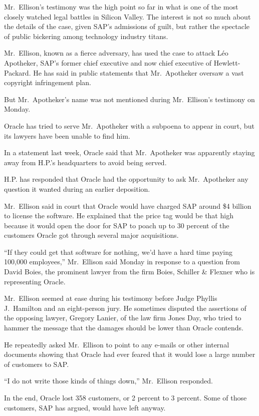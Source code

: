 ﻿\documentclass[12pt]{article}
\begin{document}
Mr.~Ellison's testimony was the high point so far in what is one of the most closely watched legal
battles in Silicon Valley. The interest is not so much about the details of the case, given SAP's
admissions of guilt, but rather the spectacle of public bickering among technology industry titans.

Mr.~Ellison, known as a fierce adversary, has used the case to attack L\'eo Apotheker, SAP's former
chief executive and now chief executive of Hewlett-Packard. He has said in public statements that
Mr.~Apotheker oversaw a vast copyright infringement plan.

But Mr.~Apotheker's name was not mentioned during Mr.~Ellison's testimony on Monday.

Oracle has tried to serve Mr.~Apotheker with a subpoena to appear in court, but its lawyers have
been unable to find him.

In a statement last week, Oracle said that Mr.~Apotheker was apparently staying away from H.P.'s
headquarters to avoid being served.

H.P. has responded that Oracle had the opportunity to ask Mr.~Apotheker any question it wanted
during an earlier deposition.

Mr.~Ellison said in court that Oracle would have charged SAP around \$4 billion to license the
software. He explained that the price tag would be that high because it would open the door for SAP
to poach up to 30 percent of the customers Oracle got through several major acquisitions.

``If they could get that software for nothing, we'd have a hard time paying 100,000 employees,''
Mr.~Ellison said Monday in response to a question from David Boies, the prominent lawyer from the
firm Boies, Schiller \& Flexner who is representing Oracle.

Mr.~Ellison seemed at ease during his testimony before Judge Phyllis J.~Hamilton and an eight-person
jury. He sometimes disputed the assertions of the opposing lawyer, Gregory Lanier, of the law firm
Jones Day, who tried to hammer the message that the damages should be lower than Oracle contends.

He repeatedly asked Mr.~Ellison to point to any e-mails or other internal documents showing that
Oracle had ever feared that it would lose a large number of customers to SAP.

``I do not write those kinds of things down,'' Mr.~Ellison responded.

In the end, Oracle lost 358 customers, or 2 percent to 3 percent. Some of those customers, SAP has
argued, would have left anyway.
\end{document}
